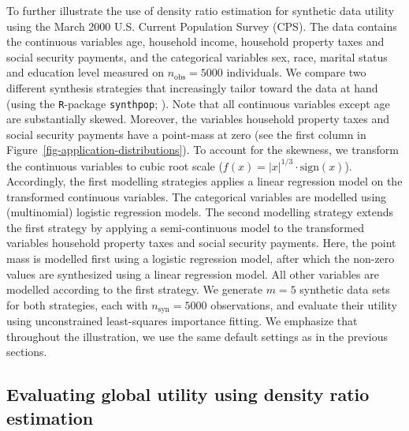 \documentclass[
]{article}
\begin{document}
\linespread{1}

\linespread{2}

To further illustrate the use of density ratio estimation for synthetic
data utility using the March 2000 U.S. Current Population Survey (CPS).
The data contains the continuous variables age, household income,
household property taxes and social security payments, and the
categorical variables sex, race, marital status and education level
measured on \(n_\text{obs} = 5000\) individuals. We compare two
different synthesis strategies that increasingly tailor toward the data
at hand (using the \texttt{R}-package \texttt{synthpop};
). Note that all
continuous variables except age are substantially skewed. Moreover, the
variables household property taxes and social security payments have a
point-mass at zero (see the first column in
Figure~\ref{fig-application-distributions}). To account for the
skewness, we transform the continuous variables to cubic root scale
(\(f(x) = |x|^{1/3}\cdot\text{sign}(x)\)). Accordingly, the first
modelling strategies applies a linear regression model on the
transformed continuous variables. The categorical variables are modelled
using (multinomial) logistic regression models. The second modelling
strategy extends the first strategy by applying a semi-continuous model
to the transformed variables household property taxes and social
security payments. Here, the point mass is modelled first using a
logistic regression model, after which the non-zero values are
synthesized using a linear regression model. All other variables are
modelled according to the first strategy. We generate \(m = 5\)
synthetic data sets for both strategies, each with
\(n_\text{syn} = 5000\) observations, and evaluate their utility using
unconstrained least-squares importance fitting. We emphasize that
throughout the illustration, we use the same default settings as in the
previous sections.

\subsection{Evaluating global utility using density ratio
estimation}\label{evaluating-global-utility-using-density-ratio-estimation}

\linespread{1}
\end{document}
